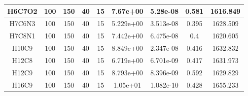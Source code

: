 \documentclass[12pt]{article}
\begin{document}
\begin{table}[h]
\begin{tabular}{|c|c|c|c|c|c|c|c|c|}
	H6C7O2            & 100          & 150          & 40             & 15             & 7.67e+00                & 5.28e-08                & 0.581                                                                  & 1616.849                                                          \\ \hline
	H7C6N3            & 100          & 150          & 40             & 15             & 5.229e+00               & 3.513e-08               & 0.395                                                                  & 1628.509                                                          \\ \hline
	H7C8N1            & 100          & 150          & 40             & 15             & 7.442e+00               & 6.475e-08               & 0.4                                                                    & 1620.605                                                          \\ \hline
	H10C9             & 100          & 150          & 40             & 15             & 8.849e+00               & 2.347e-08               & 0.416                                                                  & 1632.832                                                          \\ \hline
	H12C8             & 100          & 150          & 40             & 15             & 6.719e+00               & 6.701e-09               & 0.417                                                                  & 1631.973                                                          \\ \hline
	H12C9             & 100          & 150          & 40             & 15             & 8.793e+00               & 8.396e-09               & 0.592                                                                  & 1629.829                                                          \\ \hline
	H16C9             & 100          & 150          & 40             & 15             & 1.05e+01                & 1.082e-10               & 0.428                                                                  & 1655.233                                                          \\ \hline
	\end{tabular}
\end{table}
\end{document}
